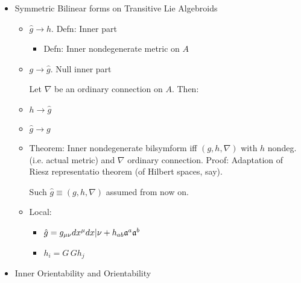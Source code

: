 {\begin{itemize}
    \item Symmetric Bilinear forms on Transitive Lie Algebroids
    
        \begin{itemize}
            
        \item $\hat g \to h$. Defn: Inner part
        
            \begin{itemize}
                
            \item Defn: Inner nondegenerate metric on $A$
                
            \end{itemize}
        
        \item $g \to \hat g$. Null inner part
        
        Let $\nabla$ be an ordinary connection on $A$. Then:
        
        \item $h \to \hat g$
        
        \item $\hat g \to g$
            
        \item Theorem: Inner nondegenerate bilsymform iff $(g, h, \nabla)$ with $h$ nondeg. (i.e. actual metric) and $\nabla$ ordinary connection. Proof: Adaptation of Riesz representatio theorem (of Hilbert spaces, say).
        
        Such $\hat g \equiv (g, h, \nabla)$ assumed from now on.
        
        \item Local:
        
            \begin{itemize}
                
            \item $\hat g = g_{\mu \nu} dx^\mu dx|\nu + h_{ab} \mathfrak{a}^a \mathfrak{a}^b$
            
            \item $h_i = G \, G h_j$
                
            \end{itemize}
        
        \end{itemize}
    
    \item Inner Orientability and Orientability
    

\end{itemize}}
